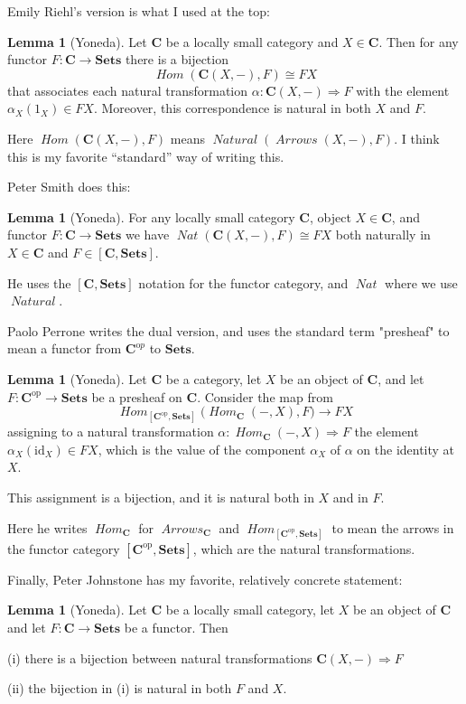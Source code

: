 \documentclass[12pt]{article}
\theoremstyle{definition}
\newtheorem{lemma}[thm]{Lemma}
\theoremstyle{definition}
\theoremstyle{definition}
\numberwithin{equation}{section}
\newcommand{\op}{\mathrm{op}}           %
\newcommand{\cat}[1]{\mathbf{#1}}      %
\newcommand{\fcat}[1]{{\mathbf {#1}}}    %
\newcommand{\id}{\mathrm{id}} %
\newcommand{\CC}{\cat{C}}
\newcommand{\CCop}{\cat{C}^{\mathrm op}}
\DeclareMathOperator{\Arrows}{\mathit{Arrows}}
\DeclareMathOperator{\Hom}{\mathit{Hom}}
\DeclareMathOperator{\Nat}{\mathit{Natural}}
\newcommand{\Set}{\fcat{Sets}}           %
\newcommand{\iso}{\cong}                %
\newcommand{\fto}{\Rightarrow}
\def\pg{\bigskip\goodbreak\ni}
\def\ni{\goodbreak\noindent}
\begin{document}
\pg
Emily Riehl's \cite{Riehl2016} version is what I used at the top:

\begin{lemma}[Yoneda]\label{yoneda-Riehl} Let $\CC$ be a locally small category and $X \in
\CC$. Then for any functor $F : \CC \to \Set$ there is a bijection
$$
\Hom(\CC(X,-), F) \iso FX
$$
that associates each natural transformation $\alpha:\CC(X,-) \fto F$ with the element
$\alpha_X(1_X) \in FX$. Moreover, this correspondence is natural in both $X$ and $F$.
\end{lemma}
\ni
Here $\Hom(\CC(X,-), F)$ means $\Nat(\Arrows(X,-), F)$. I think this is my favorite
``standard'' way of writing this.

\pg
Peter Smith \cite{Smith} does this:

\begin{lemma}[Yoneda]\label{yoneda-smith} For any locally small category $\CC$, object $X
\in \CC$, and functor $F:\CC \to \Set$ we have  $\mathop{\mathit{Nat}}(\CC(X,-),F) \iso
FX$ both naturally in $X \in \CC$ and $F \in [\CC, \Set]$.
\end{lemma}
\ni
He uses the $[\CC, \Set]$ notation for the functor category, and $\mathop{\mathit{Nat}}$
where we use $\Nat$.

\pg
Paolo Perrone \cite{Perrone} writes the dual version, and uses the standard term
"presheaf" to mean a functor from $\CCop$ to $\Set$.

\begin{lemma}[Yoneda]\label{yoneda-perrone} Let $\cat{C}$ be a category, let $X$ be an
 object of $\cat{C}$, and let $F:\cat{C}^\op\to\Set$ be a presheaf on $\cat{C}$. Consider
 the map from
 $$
 \Hom_{[\cat{C}^\op,\Set]} \bigl(\Hom_\cat{C} (-,X) , F \bigr) \to FX
 $$
 assigning to a natural transformation $\alpha:\Hom_\cat{C} (-,X)\fto F$ the element
 $\alpha_X(\id_X)\in FX$, which is the value of the component $\alpha_X$ of $\alpha$ on
 the identity at $X$. 

This assignment is a bijection, and it is natural both in $X$ and in $F$.
\end{lemma}
\ni
Here he writes $\Hom_\CC$ for $\Arrows_\CC$ and $\Hom_{[\cat{C}^\op,\Set]}$ to mean the
arrows in the functor category $[\cat{C}^\op,\Set]$, which are the natural
transformations.

\bigskip
\noindent
Finally, Peter Johnstone \cite{Johnstone} has my favorite, relatively concrete statement:

\begin{lemma}[Yoneda]\label{yoneda-johnstone} Let $\CC$ be a locally small category, let
$X$ be an object of $\CC$ and let $F:\CC \to \Set$ be a functor. Then

(i)  there is a bijection between natural transformations $\CC(X, -) \fto F$

(ii) the bijection in (i) is natural in both $F$ and $X$.
\end{lemma}
\end{document}
